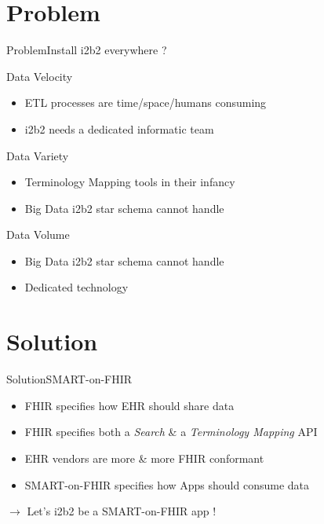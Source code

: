 \documentclass[10pt]{beamer}
\begin{document}
\section{Problem}
\begin{frame}{Problem}{Install i2b2 everywhere ?}

\begin{block}{Data Velocity}
\begin{itemize}
	\item[] ETL processes are time/space/humans consuming
	\item[] i2b2 needs a dedicated informatic team
\end{itemize}
\end{block}

\begin{block}{Data Variety}
\begin{itemize}
	\item[] Terminology Mapping tools in their infancy
	\item[] Big Data i2b2 star schema cannot handle
\end{itemize}
\end{block}

\begin{block}{Data Volume}
\begin{itemize}
	\item[] Big Data i2b2 star schema cannot handle
	\item[] Dedicated technology

\end{itemize}
\end{block}

\end{frame}

\section{Solution}
\begin{frame}{Solution}{SMART-on-FHIR}

\begin{itemize}
\item FHIR specifies how EHR should share data
\item FHIR specifies both a \emph{Search} \& a \emph{Terminology Mapping} API
\item EHR vendors are more \& more FHIR conformant
\item SMART-on-FHIR specifies how Apps should consume data
\end{itemize}
$\rightarrow$ Let's i2b2 be a SMART-on-FHIR app !
\end{frame}
\end{document}
